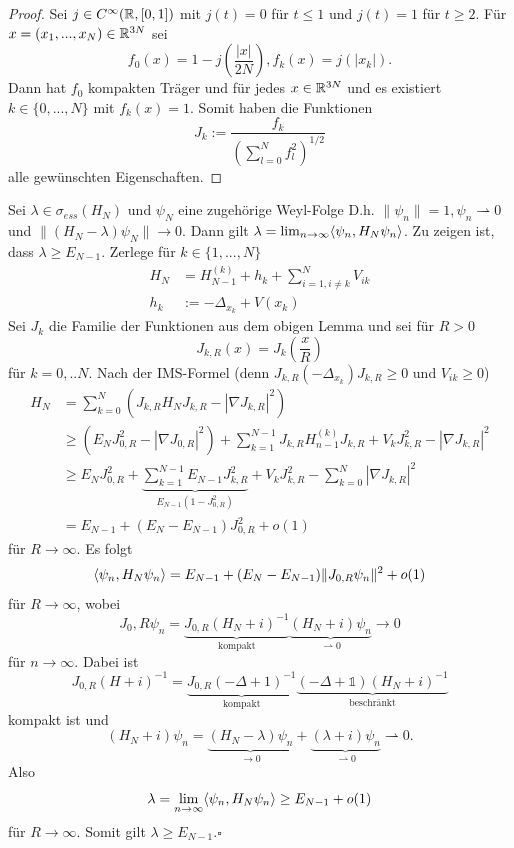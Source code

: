 \documentclass{mycourse}
\begin{document}
\begin{proof}
Sei $j\in C^\infty(\mathbb{R}, [0,1])$ mit $j(t)=0$ für $t\le 1$ und $j(t)=1$ für $t\ge 2$. %
Für $x=(x_1,...,x_N) \in \mathbb{R}^{3N}$ sei
\[
f_0(x) = 1- j(\frac{|x|}{2N}), f_k(x) = j(|x_k|).
\]
Dann hat $f_0$ kompakten Träger und für jedes $x\in \mathbb{R}^{3N}$ und es existiert $k\in \{0,..., N\}$ mit $f_k(x) =1$. Somit haben die Funktionen
\[
J_k := \frac{f_k}{(\sum_{l=0}^N f^2_l)^{1/2}}
\]
alle gewünschten Eigenschaften. %
\end{proof}

\begin{seg}
Sei $\lambda \in \sigma_{ess} (H_N)$ und $\psi_{N}$ eine zugehörige Weyl-Folge D.h. $\| \psi_n \| = 1, \psi_n \rightharpoonup 0$ und $\| (H_N - \lambda) \psi_N\| \to 0$. Dann gilt $\lambda = \lim_{n \to \infty} \langle \psi_n, H_N \psi_n\rangle$. Zu zeigen ist, dass $\lambda \ge E_{N-1}$. Zerlege für $k\in \{1,...,N\}$
\begin{align*}
H_N &= H^{(k)}_{N-1} + h_k + \sum_{i=1, i \neq k}^N V_{ik}\\
h_k&:= - \Delta_{x_k} + V(x_k)
\end{align*}
Sei $J_k$ die Familie der Funktionen aus dem obigen Lemma und sei für $R>0$
\[
J_{k,R}(x) = J_k(\frac{x}{R})
\]
für $k=0,..N$. Nach der IMS-Formel (denn $J_{k,R}(- \Delta_{x_k}) J_{k,R} \ge 0$ und $V_{ik} \ge 0$)
\begin{align*}
H_N &= \sum_{k=0}^N(J_{k,R} H_N J_{k,R} - | \nabla J_{k,R}|^2)\\
&\ge (E_N J_{0,R}^2 - | \nabla J_{0,R}|^2) + \sum_{k=1}^{N-1} J_{k,R} H_{n-1}^{(k)} J_{k,R} + V_k J_{k,R}^2 - | \nabla J_{k,R}|^2 \\
&\ge E_N J_{0,R}^2 + \underbrace{\sum_{k=1}^{N-1}  E_{N-1} J_{k,R}^2}_{E_{N-1} (1- J_{0,R}^2)} + V_k J_{k,R}^2 - \sum_{k=0}^N | \nabla J_{k,R}|^2 \\
&= E_{N-1} + (E_N - E_{N-1} ) J_{0,R}^2 + o(1)
\end{align*}
für $R\to \infty$.
Es folgt
\[
\langle \psi_n, H_N \psi_n\rangle = E_{N-1} + (E_N- E_{N-1}) \| J_{0,R} \psi_n\|^2 + o(1)
\]
für $R\to \infty$, wobei
\[
J_0,R \psi_n = \underbrace{J_{0,R} (H_N + i)^{-1}}_{\text{kompakt}} \underbrace{(H_N + i) \psi_n}_{\rightharpoonup 0} \to 0
\]
für $n\to \infty$. Dabei ist
\[
J_{0,R}(H+i)^{-1} = \underbrace{J_{0,R}(-\Delta + 1)^{-1}}_{\text{kompakt}} \underbrace{(- \Delta + \mathbb 1) (H_N +i)^{-1}}_{\text{beschränkt}}
\]
kompakt ist und
\[
(H_{N}+i) \psi_n = \underbrace{(H_N - \lambda) \psi_n}_{\to 0} + \underbrace{(\lambda +i) \psi_n}_{\rightharpoonup 0} \rightharpoonup 0.
\]
Also 
\[
\lambda = \lim_{n\to \infty}\langle \psi_n, H_N \psi_n\rangle \ge E_{N-1} + o(1)
\]
für $R\to \infty$. Somit gilt $\lambda \ge E_{N-1}$.\hfill $\square$ %
\end{seg}
\end{document}
